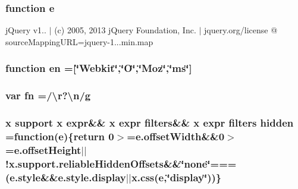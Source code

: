 \hypertarget{jquery-1_810_82_8min_8js_a2c038346d47955cbe2cb91e338edd7e1}{
\subsubsection[{e}]{\setlength{\rightskip}{0pt plus 5cm}function e}}\label{jquery-1_810_82_8min_8js_a2c038346d47955cbe2cb91e338edd7e1}
j\-Query v1.. $\vert$ (c) 2005, 2013 j\-Query Foundation, Inc. $\vert$ jquery.\-org/license @ source\-Mapping\-U\-R\-L=jquery-\/1...\-min.\-map \hypertarget{jquery-1_810_82_8min_8js_a5d7a777130eac935addcf4926a74b23c}{
\subsubsection[{en}]{\setlength{\rightskip}{0pt plus 5cm}function en =\mbox{[}\char`\"{}Webkit\char`\"{},\char`\"{}O\char`\"{},\char`\"{}Moz\char`\"{},\char`\"{}ms\char`\"{}\mbox{]}}}\label{jquery-1_810_82_8min_8js_a5d7a777130eac935addcf4926a74b23c}
\hypertarget{jquery-1_810_82_8min_8js_a37b9e1ceee4c6d2616fa6081784b5468}{
\subsubsection[{fn}]{\setlength{\rightskip}{0pt plus 5cm}var fn =/\textbackslash{}r?\textbackslash{}n/g}}\label{jquery-1_810_82_8min_8js_a37b9e1ceee4c6d2616fa6081784b5468}
\hypertarget{jquery-1_810_82_8min_8js_a086b6295ec8d15f090cd7239137a4979}{
\subsubsection[{hidden}]{ {\bf x} {\bf support} {\bf x} {\bf expr}\&\& {\bf x} {\bf expr} filters\&\& {\bf x} {\bf expr} filters hidden =function({\bf e})\{return 0$>$=e.\-offset\-Width\&\&0$>$=e.\-offset\-Height$\vert$$\vert$!x.\-support.\-reliable\-Hidden\-Offsets\&\&\char`\"{}none\char`\"{}===(e.\-style\&\&e.\-style.\-display$\vert$$\vert${\bf x.\-css}({\bf e},\char`\"{}display\char`\"{}))\}}}\label{jquery-1_810_82_8min_8js_a086b6295ec8d15f090cd7239137a4979}
